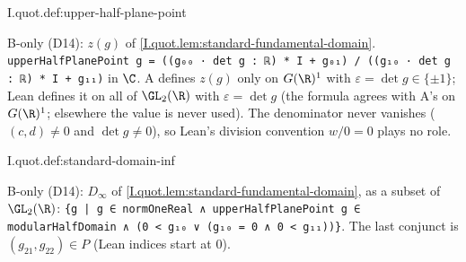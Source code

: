\begin{definition}
\bonly
{}
\end{definition}
\begin{tfformal}{I.quot.def:upper-half-plane-point}
\begin{tffidelity}
B-only (D14): $z(g)$ of \cref{I.quot.lem:standard-fundamental-domain}. \texttt{upperHalfPlanePoint g = ((g₀₀ · det g : ℝ) * I + g₀₁) / ((g₁₀ · det g : ℝ) * I + g₁₁)} in $\C$. A defines $z(g)$ only on $G(\R)^1$ with $\varepsilon=\det g\in\{\pm1\}$; Lean defines it on all of $\GL_2(\R)$ with $\varepsilon=\det g$ (the formula agrees with A's on $G(\R)^1$; elsewhere the value is never used). The denominator never vanishes ($(c,d)\neq0$ and $\det g\neq0$), so Lean's division convention $w/0=0$ plays no role.
\end{tffidelity}
\end{tfformal}

\begin{definition}
\bonly
{}
\end{definition}
\begin{tfformal}{I.quot.def:standard-domain-inf}
\begin{tffidelity}
B-only (D14): $D_\infty$ of \cref{I.quot.lem:standard-fundamental-domain}, as a subset of $\GL_2(\R)$: \texttt{\{g | g ∈ normOneReal ∧ upperHalfPlanePoint g ∈ modularHalfDomain ∧ (0 < g₁₀ ∨ (g₁₀ = 0 ∧ 0 < g₁₁))\}}. The last conjunct is $(g_{21},g_{22})\in P$ (Lean indices start at $0$).
\end{tffidelity}
\end{tfformal}

